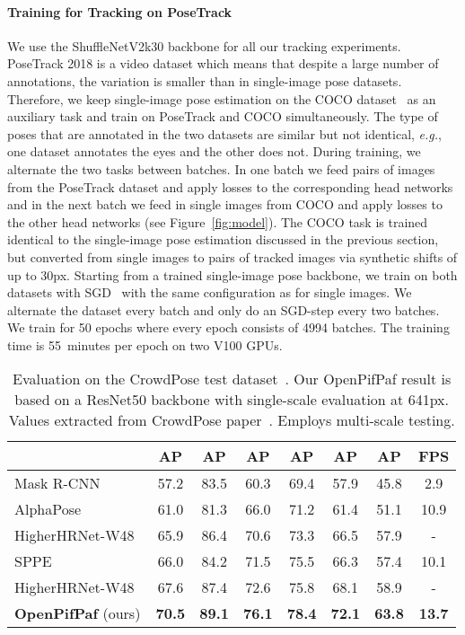 \documentclass[journal]{IEEEtran}
\begin{document}
\paragraph{Training for Tracking on PoseTrack}
We use the ShuffleNetV2k30 backbone for all our tracking experiments.
PoseTrack 2018 is a video dataset which means that despite a large number of
annotations, the variation is smaller than in single-image pose datasets.
Therefore, we keep single-image pose estimation on the
COCO dataset~\cite{lin2014microsoft} as an auxiliary task and train on
PoseTrack and COCO simultaneously.
The type of poses that are annotated in the two datasets are similar but not
identical, \textit{e.g.}, one dataset annotates the eyes and the other
does not. During training, we alternate the two tasks between batches.
In one batch we feed pairs of images from the PoseTrack dataset and apply
losses to the corresponding head networks and in the next batch we feed in single
images from COCO and apply losses to the other head networks (see Figure~\ref{fig:model}).
The COCO task is trained identical to the single-image pose estimation
discussed in the previous section, but converted from single images to
pairs of tracked images via synthetic shifts of up to 30px.
Starting from a trained single-image pose backbone,
we train on both datasets with SGD~\cite{bottou2010large} with the same
configuration as for single images. We alternate the dataset every batch
and only do an SGD-step every two batches.
We train for 50 epochs where every epoch consists of 4994 batches.
The training time is 55~minutes per epoch on two V100 GPUs.


\begin{table*}
  \centering
  \caption{Evaluation on the CrowdPose test dataset~\cite{li2019crowdpose}. Our OpenPifPaf result is based on a ResNet50 backbone with single-scale evaluation at 641px. Values extracted from CrowdPose paper~\cite{li2019crowdpose}. Employs multi-scale testing.}
  \label{tab:crowdpose}
  \begin{tabular}{|l|c c c c c c c|}
    \hline
                                              & AP & AP & AP & AP & AP & AP & FPS \\
    \hline\hline
    Mask R-CNN~\cite{he2017mask}        & 57.2 & 83.5    & 60.3   & 69.4 & 57.9 & 45.8   & 2.9 \\
    AlphaPose~\cite{fang2017rmpe}       & 61.0 & 81.3    & 66.0   & 71.2 & 61.4 & 51.1   & 10.9 \\
    HigherHRNet-W48~\cite{cheng2020higherhrnet} & 65.9 & 86.4  & 70.6   & 73.3 & 66.5 & 57.9   & - \\
    SPPE~\cite{li2019crowdpose}               & 66.0 & 84.2    & 71.5   & 75.5 & 66.3 & 57.4   & 10.1 \\
    HigherHRNet-W48~\cite{cheng2020higherhrnet} & 67.6 & 87.4 & 72.6  & 75.8 & 68.1 & 58.9  & - \\

    \textbf{OpenPifPaf} (ours)
    & \textbf{70.5} & \textbf{89.1} & \textbf{76.1}  & \textbf{78.4} & \textbf{72.1} & \textbf{63.8}   & \textbf{13.7} \\
    \hline
  \end{tabular}
\end{table*}
\end{document}
